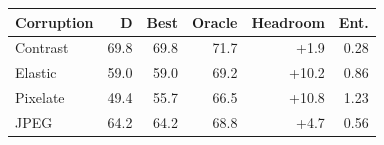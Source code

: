 \begin{tabular}{lrrrrr}
\toprule
Corruption & D & Best & Oracle & Headroom & Ent. \\
\midrule
Contrast & 69.8 & 69.8 & 71.7 & +1.9 & 0.28 \\
Elastic & 59.0 & 59.0 & 69.2 & +10.2 & 0.86 \\
Pixelate & 49.4 & 55.7 & 66.5 & +10.8 & 1.23 \\
JPEG & 64.2 & 64.2 & 68.8 & +4.7 & 0.56 \\
\bottomrule
\end{tabular}
